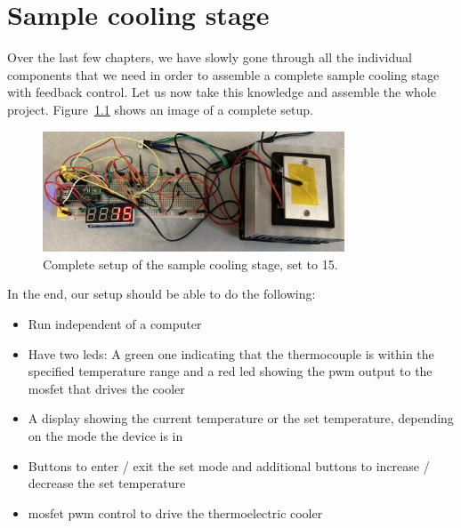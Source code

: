 
\chapter{Sample cooling stage}\label{chap:sample_cooling_stage}

Over the last few chapters, we have slowly gone through all the individual components that we need in order to assemble a complete sample cooling stage with feedback control. Let us now take this knowledge and assemble the whole project. Figure~\ref{fig:complete_setup:breadboard_setup} shows an image of a complete setup. 
\begin{figure}[tb]
    \centering
    \includegraphics[width=0.8\textwidth]{graphics/05_complete_setup/full_setup_breadboard.jpg}
    \caption{Complete setup of the sample cooling stage, set to 15\celsius.}
    \label{fig:complete_setup:breadboard_setup}
\end{figure}
In the end, our setup should be able to do the following:
\begin{itemize}
    \item Run independent of a computer
    \item Have two \acp{led}: A green one indicating that the thermocouple is within the specified temperature range and a red \ac{led} showing the \ac{pwm} output to the \ac{mosfet} that drives the cooler
    \item A display showing the current temperature or the set temperature, depending on the mode the device is in
    \item Buttons to enter / exit the set mode and additional buttons to increase / decrease the set temperature
    \item \ac{mosfet} \ac{pwm} control to drive the thermoelectric cooler
\end{itemize}


